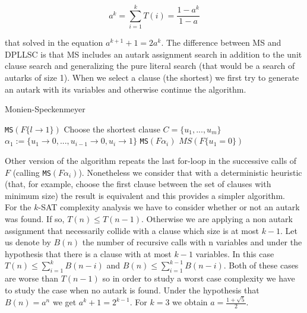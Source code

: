 $$a^k = \sum_{i=1}^kT(i) = \frac{1-a^k}{1-a}$$

that solved in the equation $a^{k+1}+1 = 2a^k$. The difference between MS and DPLLSC is that MS includes an autark assignment search in addition to the unit clause search and generalizing the pure literal search (that would be a search of autarks of size 1). When we select a clause (the shortest) we first try to generate an autark with its variables and otherwise continue the algorithm.


\begin{algorithm}
  \caption{Monien-Speckenmeyer}\label{MS}
  \begin{algorithmic}[1]
     
    \EndIf
     
    \EndIf
    \State
     \Return \texttt{MS}$(F\{l\to 1\})$
    \EndIf
     
  \EndIf
  \State Choose the shortest clause $C = \{u_1,...,u_m\}$
  \State $\alpha_1 := \{u_1\to 0,...,u_{i-1}\to 0,u_i\to 1\}$
   \Return \texttt{MS}$(F\alpha_i)$
  \EndIf
  \EndFor
   
  \EndIf
  \State \Return $MS(F\{u_1=0\})$
  \EndProcedure
\end{algorithmic}
\end{algorithm}


Other version of the algorithm repeats the last for-loop  in the successive calls of $F$ (calling \texttt{MS}$(F\alpha_i)$). Nonetheless we consider that with a deterministic heuristic (that, for example, choose the first clause between the set of clauses with minimum size) the result is equivalent and this provides a simpler algorithm.\\

For the $k$-SAT complexity analysis we have to consider whether or not an autark was found. If so, $T(n) \le T(n-1)$. Otherwise we are applying a non autark assignment that necessarily collide with a clause which size is at most $k-1$. Let us denote by $B(n)$ the number of recursive calls with n variables and under the hypothesis that there is a clause with at most $k-1$ variables. In this case $T(n) \le \sum_{i=1}^{k}B(n-i)$ and $B(n) \le \sum_{i=1}^{k-1}B(n-i)$. Both of these cases are worse than $T(n-1)$ so in order to study a worst case complexity we have to study the case when no autark is found. Under the hypothesis that $B(n) = a^n$ we get $a^k+1=2^{k-1}$. For $k=3$ we obtain $a=\frac{1 + \sqrt{5}}{2}$.



